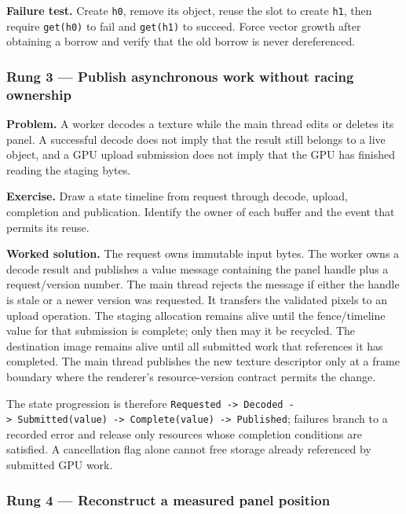 \textbf{Failure test.} Create \texttt{h0}, remove its object, reuse the slot to create \texttt{h1}, then require \texttt{get(h0)} to fail and \texttt{get(h1)} to succeed. Force vector growth after obtaining a borrow and verify that the old borrow is never dereferenced.

\subsubsection{Rung 3 --- Publish asynchronous work without racing ownership}\label{rung-3-publish-asynchronous-work-without-racing-ownership}

\textbf{Problem.} A worker decodes a texture while the main thread edits or deletes its panel. A successful decode does not imply that the result still belongs to a live object, and a GPU upload submission does not imply that the GPU has finished reading the staging bytes.

\textbf{Exercise.} Draw a state timeline from request through decode, upload, completion and publication. Identify the owner of each buffer and the event that permits its reuse.

\textbf{Worked solution.} The request owns immutable input bytes. The worker owns a decode result and publishes a value message containing the panel handle plus a request/version number. The main thread rejects the message if either the handle is stale or a newer version was requested. It transfers the validated pixels to an upload operation. The staging allocation remains alive until the fence/timeline value for that submission is complete; only then may it be recycled. The destination image remains alive until all submitted work that references it has completed. The main thread publishes the new texture descriptor only at a frame boundary where the renderer's resource-version contract permits the change.

The state progression is therefore \texttt{Requested\ -\textgreater{}\ Decoded\ -\textgreater{}\ Submitted(value)\ -\textgreater{}\ Complete(value)\ -\textgreater{}\ Published}; failures branch to a recorded error and release only resources whose completion conditions are satisfied. A cancellation flag alone cannot free storage already referenced by submitted GPU work.

\subsubsection{Rung 4 --- Reconstruct a measured panel position}\label{rung-4-reconstruct-a-measured-panel-position}


